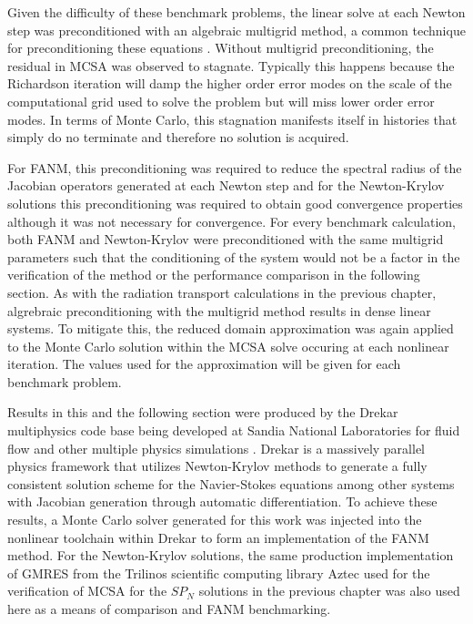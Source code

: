 Given the difficulty of these benchmark problems, the linear solve at
each Newton step was preconditioned with an algebraic multigrid
method, a common technique for preconditioning these equations
\citep{ghia_high-re_1982,evans_enhanced_2007}. Without multigrid
preconditioning, the residual in MCSA was observed to
stagnate. Typically this happens because the Richardson iteration will
damp the higher order error modes on the scale of the computational
grid used to solve the problem but will miss lower order error
modes. In terms of Monte Carlo, this stagnation manifests itself in
histories that simply do no terminate and therefore no solution is
acquired.

For FANM, this preconditioning was required to reduce the spectral
radius of the Jacobian operators generated at each Newton step and for
the Newton-Krylov solutions this preconditioning was required to
obtain good convergence properties although it was not necessary for
convergence. For every benchmark calculation, both FANM and
Newton-Krylov were preconditioned with the same multigrid parameters
such that the conditioning of the system would not be a factor in the
verification of the method or the performance comparison in the
following section. As with the radiation transport calculations in the
previous chapter, algrebraic preconditioning with the multigrid method
results in dense linear systems. To mitigate this, the reduced domain
approximation was again applied to the Monte Carlo solution within the
MCSA solve occuring at each nonlinear iteration. The values used for
the approximation will be given for each benchmark problem.

Results in this and the following section were produced by the Drekar
multiphysics code base being developed at Sandia National Laboratories
for fluid flow and other multiple physics simulations
\citep{pawlowski_drekar_2012}. Drekar is a massively parallel physics
framework that utilizes Newton-Krylov methods to generate a fully
consistent solution scheme for the Navier-Stokes equations among other
systems with Jacobian generation through automatic differentiation. To
achieve these results, a Monte Carlo solver generated for this work
was injected into the nonlinear toolchain within Drekar to form an
implementation of the FANM method. For the Newton-Krylov solutions,
the same production implementation of GMRES from the Trilinos
scientific computing library Aztec \citep{heroux_overview_2005} used
for the verification of MCSA for the $SP_N$ solutions in the previous
chapter was also used here as a means of comparison and FANM
benchmarking.

